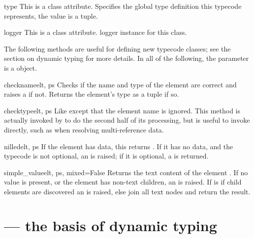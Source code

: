 \begin{memberdesc}{type}
This is a class attribute.
Specifies the global type definition this typecode represents, the value is
a  tuple.
\end{memberdesc}

\begin{memberdesc}{logger}
This is a class attribute.
logger instance for this class.
\end{memberdesc}

The following methods are useful for defining new typecode classes;
see the section on dynamic typing for more details.  In all of the following,
the  parameter is a  object.

\begin{methoddesc}{checkname}{elt, ps}
Checks if the name and type of the element  are
correct and raises a  if not.
Returns the element's type as a  tuple if so.
\end{methoddesc}

\begin{methoddesc}{checktype}{elt, ps}
Like  except that the element name is ignored.
This method is actually invoked by  to do the
second half of its processing, but is useful to invoke
directly, such as when resolving multi-reference data.
\end{methoddesc}

\begin{methoddesc}{nilled}{elt, ps}
If the element  has data, this returns .
If it has no data, and the typecode is not optional, an
 is raised; if it is optional,
a  is returned.
\end{methoddesc}

\begin{methoddesc}{simple_value}{elt, ps, mixed=False}
Returns the text content of the element .
If no value is present, or the element has non-text children, an
 is raised.  If  is  if
child elements are discovered an  is raised, else
join all text nodes and return the result.

\end{methoddesc}

\section{ --- the basis of dynamic typing}

